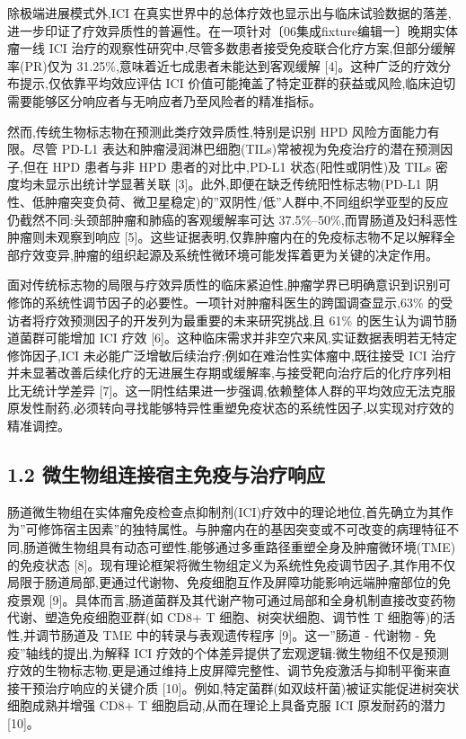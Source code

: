 \documentclass[11pt]{article}
\begin{document}
除极端进展模式外,ICI 在真实世界中的总体疗效也显示出与临床试验数据的落差,进一步印证了疗效异质性的普遍性。在一项针对〔06集成fixture编辑一〕晚期实体瘤一线 ICI 治疗的观察性研究中,尽管多数患者接受免疫联合化疗方案,但部分缓解率(PR)仅为 31.25\%,意味着近七成患者未能达到客观缓解 {[}4{]}。这种广泛的疗效分布提示,仅依靠平均效应评估 ICI 价值可能掩盖了特定亚群的获益或风险,临床迫切需要能够区分响应者与无响应者乃至风险者的精准指标。

然而,传统生物标志物在预测此类疗效异质性,特别是识别 HPD 风险方面能力有限。尽管 PD-L1 表达和肿瘤浸润淋巴细胞(TILs)常被视为免疫治疗的潜在预测因子,但在 HPD 患者与非 HPD 患者的对比中,PD-L1 状态(阳性或阴性)及 TILs 密度均未显示出统计学显著关联 {[}3{]}。此外,即便在缺乏传统阳性标志物(PD-L1 阴性、低肿瘤突变负荷、微卫星稳定)的''双阴性/低''人群中,不同组织学亚型的反应仍截然不同:头颈部肿瘤和肺癌的客观缓解率可达 37.5\%--50\%,而胃肠道及妇科恶性肿瘤则未观察到响应 {[}5{]}。这些证据表明,仅靠肿瘤内在的免疫标志物不足以解释全部疗效变异,肿瘤的组织起源及系统性微环境可能发挥着更为关键的决定作用。

面对传统标志物的局限与疗效异质性的临床紧迫性,肿瘤学界已明确意识到识别可修饰的系统性调节因子的必要性。一项针对肿瘤科医生的跨国调查显示,63\% 的受访者将疗效预测因子的开发列为最重要的未来研究挑战,且 61\% 的医生认为调节肠道菌群可能增加 ICI 疗效 {[}6{]}。这种临床需求并非空穴来风,实证数据表明若无特定修饰因子,ICI 未必能广泛增敏后续治疗;例如在难治性实体瘤中,既往接受 ICI 治疗并未显著改善后续化疗的无进展生存期或缓解率,与接受靶向治疗后的化疗序列相比无统计学差异 {[}7{]}。这一阴性结果进一步强调,依赖整体人群的平均效应无法克服原发性耐药,必须转向寻找能够特异性重塑免疫状态的系统性因子,以实现对疗效的精准调控。

\subsection{1.2 微生物组连接宿主免疫与治疗响应}\label{ux5faeux751fux7269ux7ec4ux8fdeux63a5ux5bbfux4e3bux514dux75abux4e0eux6cbbux7597ux54cdux5e94}

肠道微生物组在实体瘤免疫检查点抑制剂(ICI)疗效中的理论地位,首先确立为其作为''可修饰宿主因素''的独特属性。与肿瘤内在的基因突变或不可改变的病理特征不同,肠道微生物组具有动态可塑性,能够通过多重路径重塑全身及肿瘤微环境(TME)的免疫状态 {[}8{]}。现有理论框架将微生物组定义为系统性免疫调节因子,其作用不仅局限于肠道局部,更通过代谢物、免疫细胞互作及屏障功能影响远端肿瘤部位的免疫景观 {[}9{]}。具体而言,肠道菌群及其代谢产物可通过局部和全身机制直接改变药物代谢、塑造免疫细胞亚群(如 CD8+ T 细胞、树突状细胞、调节性 T 细胞等)的活性,并调节肠道及 TME 中的转录与表观遗传程序 {[}9{]}。这一''肠道 - 代谢物 - 免疫''轴线的提出,为解释 ICI 疗效的个体差异提供了宏观逻辑:微生物组不仅是预测疗效的生物标志物,更是通过维持上皮屏障完整性、调节免疫激活与抑制平衡来直接干预治疗响应的关键介质 {[}10{]}。例如,特定菌群(如双歧杆菌)被证实能促进树突状细胞成熟并增强 CD8+ T 细胞启动,从而在理论上具备克服 ICI 原发耐药的潜力 {[}10{]}。
\end{document}
